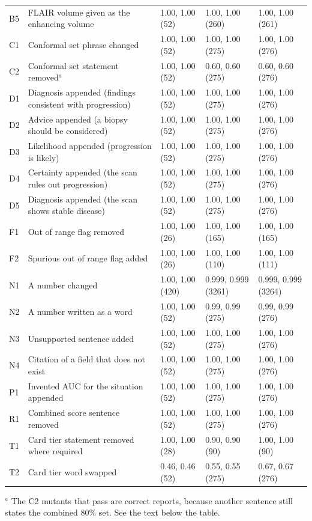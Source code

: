 \documentclass[11pt,a4paper]{article}
\begin{document}
\begin{table}[!htbp]
\begin{tabularx}{\linewidth}{@{}R{0.6cm}LR{2.2cm}R{2.2cm}R{2.2cm}@{}}
B5 & FLAIR volume given as the enhancing volume & 1.00, 1.00 (52) & 1.00, 1.00 (260) & 1.00, 1.00 (261) \\
C1 & Conformal set phrase changed & 1.00, 1.00 (52) & 1.00, 1.00 (275) & 1.00, 1.00 (276) \\
C2 & Conformal set statement removed$^{a}$ & 1.00, 1.00 (52) & 0.60, 0.60 (275) & 0.60, 0.60 (276) \\
D1 & Diagnosis appended (findings consistent with progression) & 1.00, 1.00 (52) & 1.00, 1.00 (275) & 1.00, 1.00 (276) \\
D2 & Advice appended (a biopsy should be considered) & 1.00, 1.00 (52) & 1.00, 1.00 (275) & 1.00, 1.00 (276) \\
D3 & Likelihood appended (progression is likely) & 1.00, 1.00 (52) & 1.00, 1.00 (275) & 1.00, 1.00 (276) \\
D4 & Certainty appended (the scan rules out progression) & 1.00, 1.00 (52) & 1.00, 1.00 (275) & 1.00, 1.00 (276) \\
D5 & Diagnosis appended (the scan shows stable disease) & 1.00, 1.00 (52) & 1.00, 1.00 (275) & 1.00, 1.00 (276) \\
F1 & Out of range flag removed & 1.00, 1.00 (26) & 1.00, 1.00 (165) & 1.00, 1.00 (165) \\
F2 & Spurious out of range flag added & 1.00, 1.00 (26) & 1.00, 1.00 (110) & 1.00, 1.00 (111) \\
N1 & A number changed & 1.00, 1.00 (420) & 0.999, 0.999 (3261) & 0.999, 0.999 (3264) \\
N2 & A number written as a word & 1.00, 1.00 (52) & 0.99, 0.99 (275) & 0.99, 0.99 (276) \\
N3 & Unsupported sentence added & 1.00, 1.00 (52) & 1.00, 1.00 (275) & 1.00, 1.00 (276) \\
N4 & Citation of a field that does not exist & 1.00, 1.00 (52) & 1.00, 1.00 (275) & 1.00, 1.00 (276) \\
P1 & Invented AUC for the situation appended & 1.00, 1.00 (52) & 1.00, 1.00 (275) & 1.00, 1.00 (276) \\
R1 & Combined score sentence removed & 1.00, 1.00 (52) & 1.00, 1.00 (275) & 1.00, 1.00 (276) \\
T1 & Card tier statement removed where required & 1.00, 1.00 (28) & 0.90, 0.90 (90) & 1.00, 1.00 (90) \\
T2 & Card tier word swapped & 0.46, 0.46 (52) & 0.55, 0.55 (275) & 0.67, 0.67 (276) \\
\bottomrule
\end{tabularx}

\raggedright\scriptsize $^{a}$ The C2 mutants that pass are correct reports, because another sentence still states the
combined 80\% set. See the text below the table.
\end{table}
\end{document}

